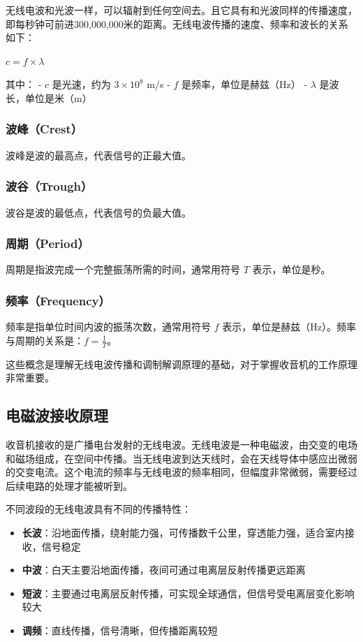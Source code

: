 \documentclass[12pt,UTF8]{ctexbook}
\begin{document}
无线电波和光波一样，可以辐射到任何空间去。且它具有和光波同样的传播速度，即每秒钟可前进300,000,000米的距离。无线电波传播的速度、频率和波长的关系如下：

$c = f \times \lambda$

其中：
- $c$ 是光速，约为 $3 \times 10^8$ m/s
- $f$ 是频率，单位是赫兹（Hz）
- $\lambda$ 是波长，单位是米（m）

\subsubsection{波峰（Crest）}
波峰是波的最高点，代表信号的正最大值。

\subsubsection{波谷（Trough）}
波谷是波的最低点，代表信号的负最大值。

\subsubsection{周期（Period）}
周期是指波完成一个完整振荡所需的时间，通常用符号 $T$ 表示，单位是秒。

\subsubsection{频率（Frequency）}
频率是指单位时间内波的振荡次数，通常用符号 $f$ 表示，单位是赫兹（Hz）。频率与周期的关系是：$f = \frac{1}{T}$。

这些概念是理解无线电波传播和调制解调原理的基础，对于掌握收音机的工作原理非常重要。

\subsection{电磁波接收原理}

收音机接收的是广播电台发射的无线电波。无线电波是一种电磁波，由交变的电场和磁场组成，在空间中传播。当无线电波到达天线时，会在天线导体中感应出微弱的交变电流。这个电流的频率与无线电波的频率相同，但幅度非常微弱，需要经过后续电路的处理才能被听到。

不同波段的无线电波具有不同的传播特性：
\begin{itemize}[leftmargin=3.5em]
    \item \textbf{长波}：沿地面传播，绕射能力强，可传播数千公里，穿透能力强，适合室内接收，信号稳定
    \item \textbf{中波}：白天主要沿地面传播，夜间可通过电离层反射传播更远距离
    \item \textbf{短波}：主要通过电离层反射传播，可实现全球通信，但信号受电离层变化影响较大
    \item \textbf{调频}：直线传播，信号清晰，但传播距离较短
\end{itemize}
\end{document}
